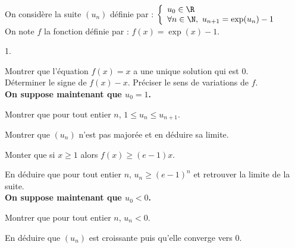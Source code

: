 \documentclass[11pt]{article}%
\begin{document}
\begin{exercice}~\\
  On considère la suite $(u_n)$ définie par :
  $
  \left\{
  \begin{array}{l}
    u_0 \in \R \\ 
    \forall n \in \N, \ u_{n+1} = \exp (u_n) - 1
  \end{array}
  \right.
  $\\[.2cm]
  On note $f$ la fonction définie par : $f(x) = \exp(x) - 1$.
\begin{noliste}{1.}
\item Montrer que l'équation $f (x) = x$ a une unique solution qui est
  $0$.\\
  Déterminer le signe de $f(x) - x$. Préciser le sens de variations de
  $f$.\\[.1cm]
  {\bf On suppose maintenant que $u_0 = 1$.}
\item Montrer que pour tout entier $n$, $1 \leq u_n \leq u_{n+1}$.
\item Montrer que $(u_n)$ n'est pas majorée et en déduire sa limite.
\item Monter que si $x \geq 1$ alors $f (x) \geq (e - 1) x$.
\item En déduire que pour tout entier $n$, $u_n \geq (e - 1)^n$ et
  retrouver la limite de la suite.\\[.1cm]
  {\bf On suppose maintenant que $u_0 < 0$.}
\item Montrer que pour tout entier $n$, $u_n < 0$.
\item En déduire que $(u_n)$ est croissante puis qu'elle converge vers 
$0$.
\end{noliste}
\end{exercice}
\end{document}
